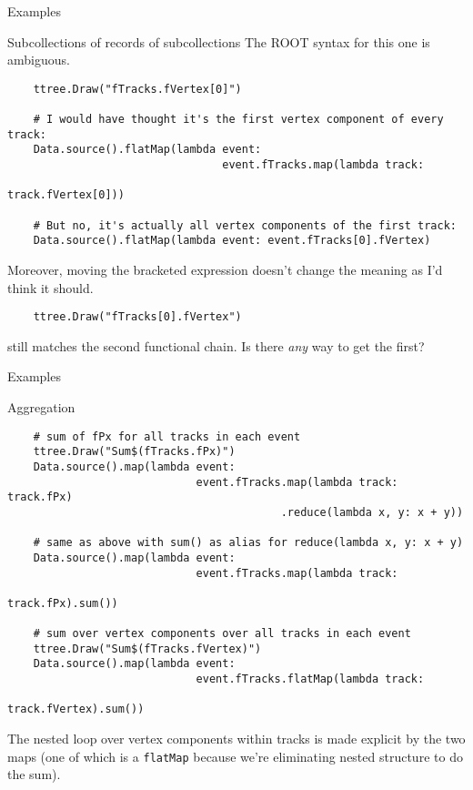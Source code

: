 \documentclass{beamer}
\begin{document}
\begin{frame}[fragile]{Examples}
\begin{block}{Subcollections of records of subcollections}
\vspace{0.5\baselineskip}
The ROOT syntax for this one is ambiguous.

\vspace{-0.5\baselineskip}
{\scriptsize \begin{verbatim}
    ttree.Draw("fTracks.fVertex[0]")

    # I would have thought it's the first vertex component of every track:
    Data.source().flatMap(lambda event:
                                 event.fTracks.map(lambda track:
                                                          track.fVertex[0]))

    # But no, it's actually all vertex components of the first track:
    Data.source().flatMap(lambda event: event.fTracks[0].fVertex)
\end{verbatim}}

Moreover, moving the bracketed expression doesn't change the meaning as I'd think it should.

{\scriptsize \begin{verbatim}
    ttree.Draw("fTracks[0].fVertex")
\end{verbatim}}

still matches the second functional chain. Is there {\it any} way to get the first?
\end{block}
\end{frame}

\begin{frame}[fragile]{Examples}
\begin{block}{Aggregation}
\vspace{-0.5\baselineskip}
{\scriptsize \begin{verbatim}
    # sum of fPx for all tracks in each event
    ttree.Draw("Sum$(fTracks.fPx)")
    Data.source().map(lambda event:
                             event.fTracks.map(lambda track: track.fPx)
                                          .reduce(lambda x, y: x + y))

    # same as above with sum() as alias for reduce(lambda x, y: x + y)
    Data.source().map(lambda event:
                             event.fTracks.map(lambda track:
                                                      track.fPx).sum())

    # sum over vertex components over all tracks in each event
    ttree.Draw("Sum$(fTracks.fVertex)")
    Data.source().map(lambda event:
                             event.fTracks.flatMap(lambda track:
                                                     track.fVertex).sum())
\end{verbatim}}

The nested loop over vertex components within tracks is made explicit by the two maps (one of which is a {\tt flatMap} because we're eliminating nested structure to do the sum).
\end{block}
\end{frame}
\end{document}
